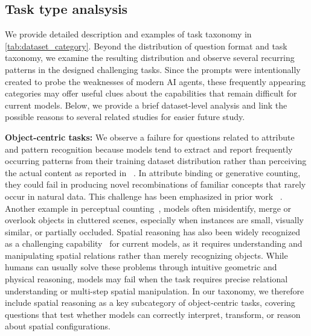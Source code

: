 \documentclass{article}
\begin{document}


\subsection{Task type analsysis}
\label{app:task_type_analyses}
We provide detailed description and examples of task taxonomy in \autoref{tab:dataset_category}.
Beyond the distribution of question format and task taxonomy, we examine the resulting distribution and observe several recurring patterns in the designed challenging tasks. Since the prompts were intentionally created to probe the weaknesses of modern AI agents, these frequently appearing categories may offer useful clues about the capabilities that remain difficult for current models. Below, we provide a brief dataset-level analysis and link the possible reasons to several related studies for easier future study.

\textbf{Object-centric tasks:} We observe a failure for questions related to attribute and pattern recognition  because models tend to extract and report frequently occurring patterns from their training dataset distribution rather than perceiving the actual content as reported in ~\cite{vo2025vision,mitrevski2025inksight,inkslop2026}. In attribute binding or generative counting, they could fail in producing novel recombinations of familiar concepts that rarely occur in natural data. This challenge has been emphasized in prior work ~\cite{wiedemer2023compositional,keysers2019measuring,redhardt2025scaling,binyamin2025make}.  Another example in perceptual counting~\citep{zhang2018learning,acharya2019tallyqa}, models often misidentify, merge or overlook objects in cluttered scenes, especially when instances are small, visually similar, or partially occluded. Spatial reasoning has also been widely recognized as a challenging capability~\cite{spatialab,liu2025spatial} for current models, as it requires understanding and manipulating spatial relations rather than merely recognizing objects. While humans can usually solve these problems through intuitive geometric and physical reasoning, models may fail when the task requires precise relational understanding or multi-step spatial manipulation. In our taxonomy, we therefore include spatial reasoning as a key subcategory of object-centric tasks, covering questions that test whether models can correctly interpret, transform, or reason about spatial configurations.
\end{document}
